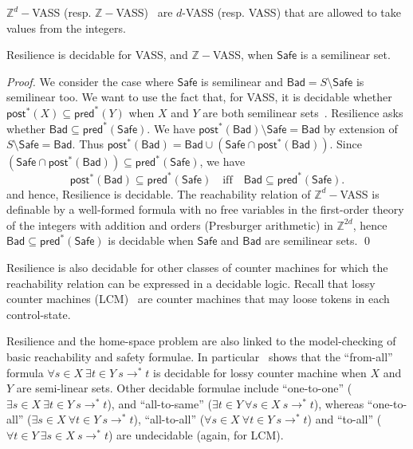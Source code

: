\documentclass[runningheads]{llncs}
\newcommand{\pred}{\textsf{pred}}
\newcommand{\post}{\textsf{post}}
\newcommand{\Bad}{\textsf{Bad}}
\newcommand{\Safe}{\textsf{Safe}}
\begin{document}
$\mathbb{Z}^d-$VASS (resp. $\mathbb{Z}-$VASS)~\cite{DBLP:conf/rp/HaaseH14} are $d$-VASS (resp. VASS) that are allowed to take values from the integers.

\begin{theorem}\label{SL VASS}
{\sc Resilience} is decidable for VASS, and $\mathbb{Z}-$VASS, when $\Safe$  is a semilinear set.
\end{theorem}

\begin{proof}
We consider the case where $\Safe$ is semilinear
and $\Bad = S \setminus \Safe$ is semilinear too.
We want to use the fact that, for VASS,
it is decidable whether $\post^*(X) \subseteq \pred^*(Y)$ when 
$X$ and $Y$ are both semilinear sets~\cite{DBLP:journals/corr/abs-2207-02697}.
{\sc Resilience} asks whether $\Bad \subseteq \pred^*(\Safe)$.
We have $\post^*(\Bad) \setminus \Safe = \Bad$ by extension of $S \setminus \Safe = \Bad$.
Thus $\post^*(\Bad) = \Bad \cup (\Safe \cap \post^*(\Bad))$. Since $(\Safe \cap \post^*(\Bad)) \subseteq \pred^*(\Safe)$, we have
\[\post^*(\Bad) \subseteq \pred^*(\Safe) \quad \text{iff} \quad \Bad \subseteq \pred^*(\Safe).\]
and hence, {\sc Resilience} is decidable. 
The reachability relation of 
 $\mathbb{Z}^d-$VASS is definable by a well-formed formula with no free variables in the first-order theory of the integers with addition and orders (Presburger arithmetic) in $\mathbb{Z}^{2d}$, hence	$\Bad \subseteq \pred^*(\Safe)$ is decidable when $\Safe$ and $\Bad$ are semilinear sets. \qed
\end{proof}

{\sc Resilience} is also decidable for other classes of counter machines for which the reachability relation can be expressed in a decidable logic. Recall that lossy counter machines (LCM)~\cite{DBLP:conf/rp/Schnoebelen10} are counter machines that may loose tokens in each control-state.

Resilience and the home-space problem are also linked to the 
model-checking of basic reachability and safety formulae. 
In particular~\cite{DBLP:conf/rp/Schnoebelen10} shows that the ``from-all'' formula $\forall s \in X~ \exists t \in Y~ s \to^* t$
is decidable for lossy counter machine
when $X$ and $Y$ are semi-linear sets.
Other decidable formulae include ``one-to-one'' ($\exists s \in  X ~ \exists t \in  Y ~ s \to^* 
 t$), and ``all-to-same'' ($\exists t \in  Y ~ \forall s \in  X ~ s \to^*  t$),
whereas ``one-to-all'' ($\exists s \in  X ~ \forall t \in  Y ~ s \to^*  t$), 
``all-to-all'' ($\forall s \in  X ~ \forall t \in  Y ~ s \to^*  t$)
  and ``to-all'' ($\forall t \in  Y  ~ \exists s \in  X ~ s \to^*  t$) are undecidable (again, for LCM). 
\end{document}
